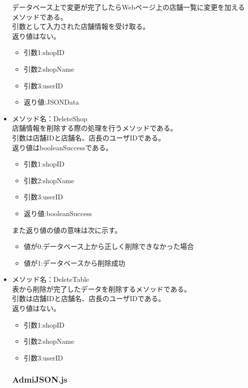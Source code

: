 \documentclass[a4j]{jarticle}
\begin{document}
\begin{itemize}
データベース上で変更が完了したらWebページ上の店舗一覧に変更を加えるメソッドである。\\
引数として入力された店舗情報を受け取る。\\
返り値はない。

	\begin{itemize}
		\item 引数1:shopID
		\item 引数2:shopName
		\item 引数3:userID
		\item 返り値:JSONData
	\end{itemize}

\item メソッド名：DeleteShop\\

店舗情報を削除する際の処理を行うメソッドである。\\
引数は店舗IDと店舗名、店長のユーザIDである。\\
返り値はbooleanSuccessである。

	\begin{itemize}
		\item 引数1:shopID
		\item 引数2:shopName
		\item 引数3:userID
		\item 返り値:booleanSuccess
	\end{itemize}
また返り値の値の意味は次に示す。
	\begin{itemize}
		\item 値が0:データベース上から正しく削除できなかった場合
		\item 値が1:データベースから削除成功
	\end{itemize}

\item メソッド名：DeleteTable\\

表から削除が完了したデータを削除するメソッドである。\\
引数は店舗IDと店舗名、店長のユーザIDである。\\
返り値はない。
	\begin{itemize}
		\item 引数1:shopID
		\item 引数2:shopName
		\item 引数3:userID
	\end{itemize}
\subsubsection{AdmiJSON.js}


\end{itemize}
\end{document}
